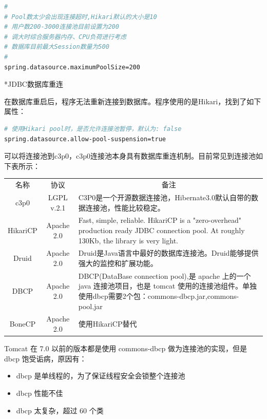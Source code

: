 \documentclass[11pt,fleqn]{book}
\makeatletter
\numberwithin{dummy}{section}
\theoremstyle{ocrenumbox}
\theoremstyle{blacknumex}
\theoremstyle{blacknumbox}
\theoremstyle{ocrenum}
\renewcommand{\subsection}{\@startsection {subsection}{2}{\z@}
	{-3ex \@plus -0.1ex \@minus -.4ex}
	{0.5ex \@plus.2ex }
	{\normalfont\sffamily\bfseries}}
\makeatother
\begin{document}
\begin{lstlisting}[language=Bash]
#
# Pool数太少会出现连接超时,Hikari默认的大小是10
# 用户数200-3000连接池目前设置为200
# 调大时综合服务器内存、CPU负荷进行考虑
# 数据库目前最大Session数量为500
#
spring.datasource.maximumPoolSize=200
\end{lstlisting}


\subsection*{JDBC数据库重连}

在数据库重启后，程序无法重新连接到数据库。程序使用的是Hikari，找到了如下属性：

\begin{lstlisting}[language=Bash]
# 使用Hikari pool时，是否允许连接池暂停，默认为: false
spring.datasource.allow-pool-suspension=true
\end{lstlisting}

可以将连接池到c3p0，c3p0连接池本身具有数据库重连机制。目前常见到连接池如下表所示：

\begin{tabular}{|c|c|p{7cm}|}
	\hline
	\multirow{1}{*}{名称}
	& \multicolumn{1}{c|}{协议} 
	& \multicolumn{1}{c|}{备注}\\			
	\cline{1-3}
	c3p0 &  LGPL v.2.1  & C3P0是一个开源数据连接池，Hibernate3.0默认自带的数据连接池，性能比较稳定。\\
	\hline
	HikariCP & Apache 2.0 & Fast, simple, reliable. HikariCP is a "zero-overhead" production ready JDBC connection pool. At roughly 130Kb, the library is very light. \\
	\hline
	Druid & Apache 2.0 & Druid是Java语言中最好的数据库连接池。Druid能够提供强大的监控和扩展功能。 \\
	\hline
	DBCP & Apache 2.0 & DBCP(DataBase connection pool),是 apache 上的一个 java 连接池项目，也是 tomcat 使用的连接池组件。单独使用dbcp需要2个包：commons-dbcp.jar,commons-pool.jar \\
	\hline
	BoneCP & Apache 2.0 & 使用HikariCP替代\\
	\hline
\end{tabular}

Tomcat 在 7.0 以前的版本都是使用 commons-dbcp 做为连接池的实现，但是 dbcp 饱受诟病，原因有：

\begin{itemize}
	\item{dbcp 是单线程的，为了保证线程安全会锁整个连接池}
	\item{dbcp 性能不佳}
	\item{dbcp 太复杂，超过 60 个类}
\end{itemize}
\end{document}
